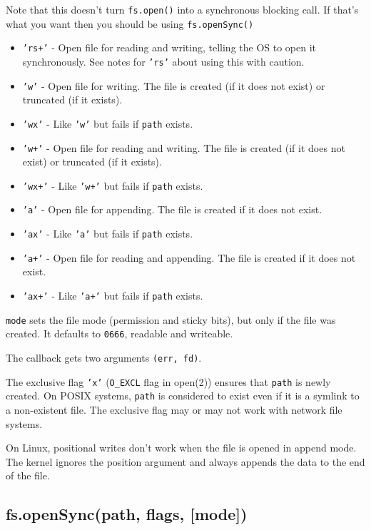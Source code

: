 Note that this doesn't turn \texttt{fs.open()} into a synchronous
blocking call. If that's what you want then you should be using
\texttt{fs.openSync()}

\begin{itemize}
\item
  \texttt{'rs+'} - Open file for reading and writing, telling the OS to
  open it synchronously. See notes for \texttt{'rs'} about using this
  with caution.
\item
  \texttt{'w'} - Open file for writing. The file is created (if it does
  not exist) or truncated (if it exists).
\item
  \texttt{'wx'} - Like \texttt{'w'} but fails if \texttt{path} exists.
\item
  \texttt{'w+'} - Open file for reading and writing. The file is created
  (if it does not exist) or truncated (if it exists).
\item
  \texttt{'wx+'} - Like \texttt{'w+'} but fails if \texttt{path} exists.
\item
  \texttt{'a'} - Open file for appending. The file is created if it does
  not exist.
\item
  \texttt{'ax'} - Like \texttt{'a'} but fails if \texttt{path} exists.
\item
  \texttt{'a+'} - Open file for reading and appending. The file is
  created if it does not exist.
\item
  \texttt{'ax+'} - Like \texttt{'a+'} but fails if \texttt{path} exists.
\end{itemize}

\texttt{mode} sets the file mode (permission and sticky bits), but only
if the file was created. It defaults to \texttt{0666}, readable and
writeable.

The callback gets two arguments \texttt{(err, fd)}.

The exclusive flag \texttt{'x'} (\texttt{O\_EXCL} flag in open(2))
ensures that \texttt{path} is newly created. On POSIX systems,
\texttt{path} is considered to exist even if it is a symlink to a
non-existent file. The exclusive flag may or may not work with network
file systems.

On Linux, positional writes don't work when the file is opened in append
mode. The kernel ignores the position argument and always appends the
data to the end of the file.

\subsection{fs.openSync(path, flags,
{[}mode{]})}\label{fs.opensyncpath-flags-mode}

